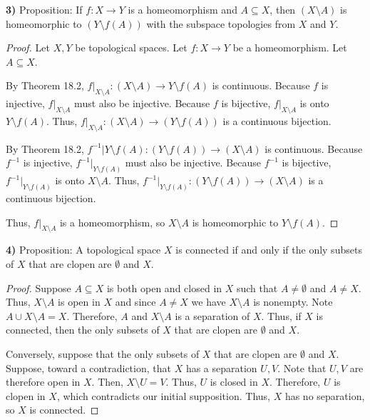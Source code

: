\documentclass[12pt]{report}
\newcommand{\inv}{^{-1}}
\begin{document}
\newpage\noindent\textbf{3)} Proposition: If $f: X \to Y$ is a homeomorphism and $A \subseteq X$, then $(X \setminus A)$ is homeomorphic to $(Y \setminus f(A))$ with the subspace topologies from $X$ and $Y$.
\begin{proof}
    Let $X, Y$ be topological spaces.
    Let $f: X \to Y$ be a homeomorphism.
    Let $A \subseteq X$.

    By Theorem 18.2, $f|_{X \setminus A}: (X \setminus A) \to Y \setminus f(A)$ is continuous.
    Because $f$ is injective, $f|_{X \setminus A}$ must also be injective.
    Because $f$ is bijective, $f|_{X \setminus A}$ is onto $Y \setminus f(A)$.
    Thus, $f|_{X \setminus A}: (X \setminus A) \to (Y \setminus f(A))$ is a continuous bijection.

    By Theorem 18.2, $f\inv|{Y \setminus f(A)} : (Y \setminus f(A)) \to (X \setminus A)$ is continuous.
    Because $f\inv$ is injective, $f\inv|_{Y \setminus f(A)}$ must also be injective.
    Because $f\inv$ is bijective, $f\inv|_{Y \setminus f(A)}$ is onto $X \setminus A$.
    Thus, $f\inv|_{Y \setminus f(A)}: (Y \setminus f(A)) \to (X \setminus A)$ is a continuous bijection.

    Thus, $f|_{X \setminus A}$ is a homeomorphism, so $X \setminus A$ is homeomorphic to $Y \setminus f(A)$.
\end{proof}

\newpage\noindent\textbf{4)} Proposition: A topological space $X$ is connected if and only if the only subsets of $X$ that are clopen are $\emptyset$ and $X$.
\begin{proof}
    Suppose $A \subseteq X$ is both open and closed in $X$ such that $A \neq \emptyset$ and $A \neq X$.
    Thus, $X \setminus A$ is open in $X$ and since $A \neq X$ we have $X \setminus A$ is nonempty.
    Note $A \cup X \setminus A = X$.
    Therefore, $A$ and $X \setminus A$ is a separation of $X$.
    Thus, if $X$ is connected, then the only subsets of $X$ that are clopen are $\emptyset$ and $X$.

    Conversely, suppose that the only subsets of $X$ that are clopen are $\emptyset$ and $X$.
    Suppose, toward a contradiction, that $X$ has a separation $U,V$.
    Note that $U,V$ are therefore open in $X$.
    Then, $X \setminus U = V$.
    Thus, $U$ is closed in $X$.
    Therefore, $U$ is clopen in $X$, which contradicts our initial supposition.
    Thus, $X$ has no separation, so $X$ is connected.
\end{proof}
\end{document}
